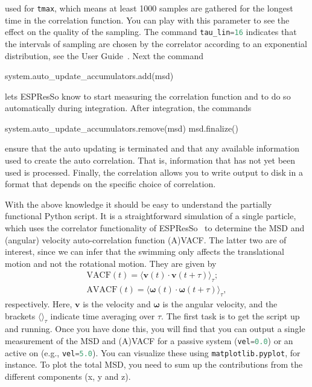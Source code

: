 \documentclass[aip,jcp,reprint,a4paper,onecolumn,amsmath]{revtex4-1}
\newcommand{\es}{\mbox{\textsf{ESPResSo}}\xspace}
\newcommand\codees{\lstinline[language=python]}
\begin{document}
used for \codees{tmax}, which means at least 1000 samples are gathered for the
longest time in the correlation function. You can play with this parameter to
see the effect on the quality of the sampling. The command \codees{tau_lin=16}
indicates that the intervals of sampling are chosen by the correlator according
to an exponential distribution, see the User Guide~\cite{UG}. Next the command
\begin{espresso}
system.auto_update_accumulators.add(msd)
\end{espresso}
lets \es{} know to start measuring the correlation function and to do so
automatically during integration. After integration, the commands
\begin{espresso}
system.auto_update_accumulators.remove(msd)
msd.finalize()
\end{espresso}
ensure that the auto updating is terminated and that any available information
used to create the auto correlation. That is, information that has not yet been
used is processed. Finally, the correlation allows you to write output to disk
in a format that depends on the specific choice of correlation.

With the above knowledge it should be easy to understand the partially
functional Python script. It is a straightforward simulation of a single
particle, which uses the correlator functionality of \es{}~\cite{Arnold_13,UG}
to determine the MSD and (angular) velocity auto-correlation function (A)VACF.
The latter two are of interest, since we can infer that the swimming only
affects the translational motion and not the rotational motion. They are given
by
\begin{eqnarray}
\label{eq:vacf} \mathrm{VACF}(t) = \langle \mathbf{v}(t) \cdot \mathbf{v}(t + \tau) \rangle_{\tau}; \\
\label{eq:avacf} \mathrm{AVACF}(t) = \langle \boldsymbol{\omega}(t) \cdot \boldsymbol{\omega}(t + \tau) \rangle_{\tau} ,
\end{eqnarray}
respectively. Here, $\mathbf{v}$ is the velocity and $\boldsymbol{\omega}$ is
the angular velocity, and the brackets $\langle \rangle_{\tau}$ indicate time
averaging over $\tau$. The first task is to get the script up and running. Once
you have done this, you will find that you can output a single measurement of
the MSD and (A)VACF for a passive system (\codees{vel=0.0}) or an active on
(e.g., \codees{vel=5.0}). You can visualize these using 
\codees{matplotlib.pyplot}, for instance. To plot the total MSD, 
you need to sum up the contributions from the different components (x, y and z).
\end{document}
